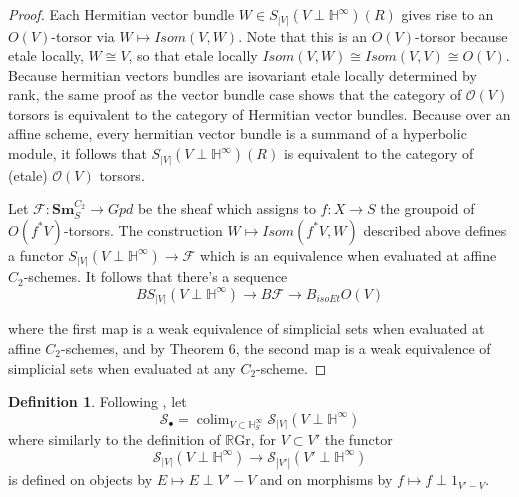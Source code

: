 \documentclass[draftthesis,tocnosub,noragright,centerchapter,10pt]{uiucthesis2009}
\newcommand{\Z}{\mathbb Z}
\newcommand{\mbb}{\mathbb}
\newcommand{\mc}{\mathcal}
\newcommand{\RGr}{\mathbb R\mathrm{Gr}}
\newcommand{\Sm}[1]{\mathbf{Sm}_{#1}}
\DeclareMathOperator*{\colim}{colim}
\theoremstyle{plain}
\theoremstyle{definition}
\newtheorem{definition}[lemma]{Definition}
\begin{document}
\begin{proof}




Each Hermitian vector bundle $W  \in S_{|V|}(V\perp \mbb H^\infty)(R)$
gives rise to an $ O(V)$-torsor via $W \mapsto Isom(V,W)$. Note
that this is an $O(V)$-torsor because etale locally, $W \cong V$,
so that etale locally $Isom(V,W) \cong Isom(V,V) \cong 
O(V)$. Because hermitian vectors bundles are isovariant etale locally
determined by rank, the same proof as the vector bundle case shows
that the category of $\mc O(V)$ torsors is equivalent to the category
of Hermitian vector bundles. Because over an affine scheme, every
hermitian vector bundle is a summand of a hyperbolic module, it
follows that $S_{|V|}(V\perp \mbb H^\infty)(R)$ is equivalent to the
category of (etale) $\mc O(V)$ torsors. 

Let $\mc F : \Sm{S}^{C_2} \rightarrow Gpd$ be the sheaf which assigns
to $f : X \rightarrow S$ the groupoid of $ O(f^*V)$-torsors. The
construction $W \mapsto Isom(f^*V,W)$ described above defines a
functor $S_{|V|}(V\perp \mbb H^\infty) \rightarrow \mc F$ which is an
equivalence when evaluated at affine $C_2$-schemes. It follows that
there's a sequence
\[
B S_{|V|}(V\perp \mbb H^\infty) \rightarrow B\mc F \rightarrow B_{isoEt}O(V)
\]

where the first map is a weak equivalence of simplicial sets when
evaluated at affine $C_2$-schemes, and by \cite{Jar01} Theorem 6, the second map is a
weak equivalence of simplicial sets when evaluated at any
$C_2$-scheme. 
\end{proof}


\begin{definition}
Following \cite{SchTri}, let
\[
\mc S_\bullet = \colim_{V \subset \mbb H^\infty_S} \mc S_{|V|}(V \perp
\mbb H^\infty)
\]
where similarly to the definition of $\RGr$, for $V \subset V'$ the
functor 
\[
\mc S_{|V|}(V \perp
\mbb H^\infty) \rightarrow \mc S_{|V'|}(V' \perp
\mbb H^\infty)
\]
is defined on objects by $E \mapsto E \perp V'-V$ and on morphisms by
$f \mapsto f \perp 1_{V'-V}$. 
\end{definition}
\end{document}

